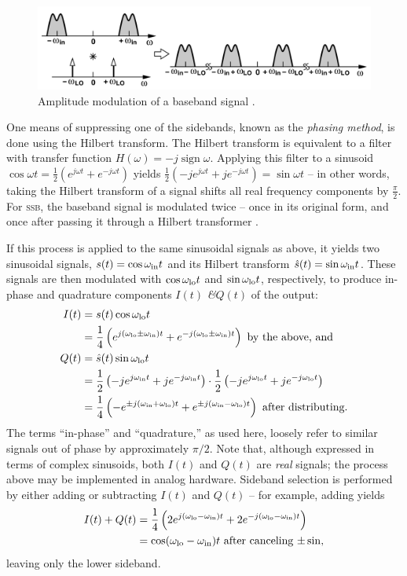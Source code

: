 \documentclass[12pt]{article}
\newcommand{\amp}{\textit{\&}\xspace}
\newcommand{\ssb}{\textsc{ssb}\xspace}
\DeclareMathOperator{\sign}{sign}
\begin{document}
\begin{figure}[h]
	\centering
	\includegraphics[width=.9\textwidth]{razavi-am.png}
	\caption{Amplitude modulation of a baseband signal
	\autocite{rf-microelectronics}.}
	\label{fig:razavi-am}
\end{figure}

One means of suppressing one of the sidebands, known as the \emph{phasing
method}, is done using the Hilbert transform. The Hilbert transform is
equivalent to a filter with transfer function \(H(\omega) = -j \sign \omega\).
Applying this filter to a  sinusoid \(\cos \omega t = \frac 1 2 (e^{j \omega t}
+ e^{-j \omega t})\) yields \(\frac 1 2 (-j e^{j \omega t} + j e^{-j \omega t})
= \sin \omega t\) -- in other words, taking the Hilbert transform of a signal
shifts all real frequency components by \(\frac \pi 2\). For \ssb, the baseband
signal is modulated twice -- once in its original form, and once after passing
it through a Hilbert transformer \autocite{ssb-tretter}.

If this process is applied to the same sinusoidal signals as above, it yields
two sinusoidal signals, \(s(t) = \cos \omega_\text{in} t \) and its Hilbert transform
\(\hat s(t) = \sin \omega_\text{in} t\). These signals are then modulated with \(\cos \omega_\text{lo}
t\) and \(\sin \omega_\text{lo} t\), respectively, to produce in-phase and quadrature
components \(I(t)\) \amp \(Q(t)\) of the output:
\begin{align*}
	I(t) &= s(t) \cos \omega_\text{lo} t \\
		&= \frac 1 4 \left(
			e^{j (\omega_\text{lo} \pm \omega_\text{in}) t} + e^{-j (\omega_\text{lo} \pm \omega_\text{in}) t}
		\right) \text{ by the above, and} \\
	Q(t) &= \hat s(t) \sin \omega_\text{lo} t \\
		&= \frac 1 2 \left(-j e^{j \omega_\text{in} t} + j e^{-j \omega_\text{in} t}\right)
			\cdot \frac 1 2 \left(
				-j e^{j \omega_\text{lo} t} + j e^{-j \omega_\text{lo} t}\right
			) \\
		&= \frac 1 4 \left(
			-e^{\pm j (\omega_\text{in} + \omega_\text{lo}) t} + e^{\pm j (\omega_\text{in} - \omega_\text{lo}) t}
		\right) \text { after distributing.}
\end{align*}
The terms ``in-phase'' and ``quadrature,'' as used here, loosely refer to
similar signals out of phase by approximately \(\pi/2\). Note that, although
expressed in terms of complex sinusoids, both \(I(t)\) and \(Q(t)\) are
\emph{real} signals; the process above may be implemented in analog hardware.
Sideband selection is performed by either adding or subtracting \(I(t)\) and
\(Q(t)\) -- for example, adding yields
\begin{align*}
	I(t) + Q(t) &= \frac 1 4 \left(
		2 e^{j (\omega_\text{lo} - \omega_\text{in}) t} + 2 e^{-j (\omega_\text{lo} - \omega_\text{in}) t}
	\right) \\
	&= \cos (\omega_\text{lo} - \omega_\text{in}) t \text{ after canceling \(\pm \sin\),}
\end{align*}
leaving only the lower sideband.
\end{document}
